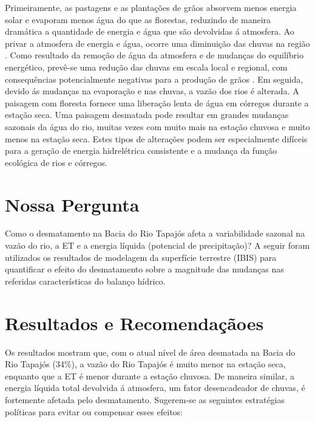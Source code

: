 \documentclass[DIV=calc, paper=a4, fontsize=11pt,twocolumn,margin=.5in]{scrartcl}	 %
\begin{document}
Primeiramente, as pastagens e as planta\c c\~oes de gr\~{a}os absorvem menos energia solar e evaporam menos \'{a}gua do que as florestas, reduzindo de maneira dram\'{a}tica a quantidade de energia e \'{a}gua que s\~{a}o devolvidas \'{a} atmosfera. Ao privar a atmosfera de energia e \'{a}gua, ocorre uma diminui\c c\~{a}o das chuvas na regi\~{a}o \cite{coe2009influence}. Como resultado da remo\c c\~{a}o de \'{a}gua da atmosfera e de mudan\c cas do equilíbrio energ\'etico, prev\^{e}-se uma redu\c c\~{a}o das chuvas em escala local e regional, com consequ\^{e}ncias potencialmente negativas para a produ\c c\~{a}o de gr\~{a}os \cite{oliveira2013large}. Em seguida, devido \'as mudan\c cas na evapora\c c\~{a}o e nas chuvas, a vaz\~{a}o dos rios \'e alterada. A paisagem com floresta fornece uma libera\c c\~{a}o lenta de \'agua em c\'orregos durante a esta\c c\~{a}o seca. Uma paisagem desmatada pode resultar em grandes mudan\c cas sazonais da \'agua do rio, muitas vezes com muito mais na esta\c c\~{a}o chuvosa e muito menos na esta\c c\~{a}o seca. Estes tipos de altera\c c\~{o}es podem ser especialmente dif\'iceis para a gera\c c\~{a}o de energia hidrel\'etrica consistente e a mudan\c ca da fun\c c\~{a}o ecol\'ogica de rios e c\'orregos.


\section*{Nossa Pergunta}
Como o desmatamento na Bacia do Rio Tapaj\'{o}s afeta a variabilidade sazonal na vaz\~{a}o do rio, a ET e a energia líquida (potencial de precipita\c c\~{a}o)? A seguir foram utilizados os resultados de modelagem da superf\'icie terrestre (IBIS) para quantificar o efeito do desmatamento sobre a magnitude das mudan\c cas nas referidas caracter\'isticas do balan\c co h\'idrico.

\section*{Resultados e Recomenda\c c\~{a}oes}
Os resultados mostram que, com o atual nível de \'area desmatada na Bacia do Rio Tapaj\'os (34\%), a vaz\~{a}o do Rio Tapaj\'os \'e muito menor na esta\c c\~{a}o seca, enquanto que a ET \'e menor durante a esta\c c\~{a}o chuvosa. De maneira similar, a energia líquida total devolvida \'a atmosfera, um fator desencadeador de chuvas, \'e fortemente afetada pelo desmatamento. Sugerem-se as seguintes estrat\'egias pol\'iticas para evitar ou compensar esses efeitos:
\end{document}

